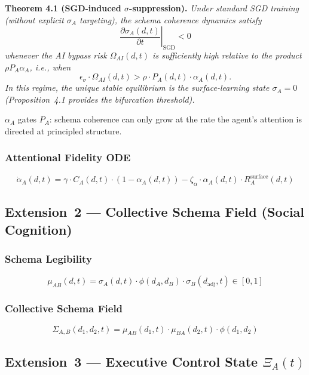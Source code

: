 \documentclass[11pt,a4paper]{article}
\begin{document}
\textbf{Theorem 4.1 (SGD-induced $\sigma$-suppression).}
\textit{Under standard SGD training (without explicit $\sigma_A$ targeting), the schema coherence dynamics satisfy}
\[
\left.\frac{\partial \sigma_A(d,t)}{\partial t}\right|_{\text{SGD}} < 0
\]
\textit{whenever the AI bypass risk $\Omega_{AI}(d,t)$ is sufficiently high relative to the product $\rho P_A \alpha_A$, i.e., when}
\[
\epsilon_{\sigma} \cdot \Omega_{AI}(d,t) > \rho \cdot P_A(d,t) \cdot \alpha_A(d,t).
\]
\textit{In this regime, the unique stable equilibrium is the surface-learning state $\sigma_A = 0$ (Proposition~4.1 provides the bifurcation threshold).}

$\alpha_A$ gates $P_A$: schema coherence can only grow at the rate the
agent's attention is directed at principled structure.

\subsubsection{Attentional Fidelity ODE}
\begin{equation}\label{eq:alpha-ode}
\dot{\alpha}_A(d,t) = \gamma \cdot C_A(d,t) \cdot (1 - \alpha_A(d,t)) - \zeta_{\alpha} \cdot \alpha_A(d,t) \cdot R_A^{\text{surface}}(d,t)
\end{equation}

\subsection{Extension~2 --- Collective Schema Field (Social Cognition)}\label{sec:social}

\subsubsection{Schema Legibility}
\begin{equation}\label{eq:schema-legibility}
\mu_{AB}(d,t) = \sigma_A(d,t) \cdot \phi(d_A, d_B) \cdot \sigma_B(d_{\text{adj}},t) \in [0,1]
\end{equation}

\subsubsection{Collective Schema Field}
\begin{equation}\label{eq:collective-field}
\Sigma_{A,B}(d_1,d_2,t) = \mu_{AB}(d_1,t) \cdot \mu_{BA}(d_2,t) \cdot \phi(d_1,d_2)
\end{equation}

\subsection{Extension~3 --- Executive Control State \texorpdfstring{$\Xi_A(t)$}{Xi\_A(t)}}\label{sec:executive}
\end{document}
